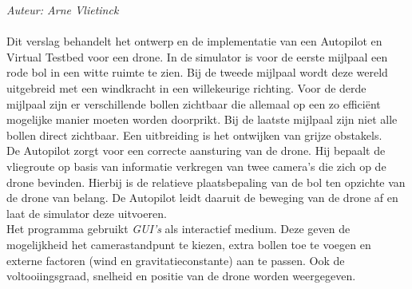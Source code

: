 \noindent
{\em Auteur: Arne Vlietinck}\\
\\
Dit verslag behandelt het ontwerp en de implementatie van een Autopilot en Virtual Testbed voor een drone. In de simulator is voor de eerste mijlpaal een rode bol in een witte ruimte te zien. Bij de tweede mijlpaal wordt deze wereld uitgebreid met een windkracht in een willekeurige richting. Voor de derde mijlpaal zijn er verschillende bollen zichtbaar die allemaal op een zo efficiënt mogelijke manier moeten worden doorprikt. Bij de laatste mijlpaal zijn niet alle bollen direct zichtbaar. Een uitbreiding is het ontwijken van grijze obstakels.
\\
De Autopilot zorgt voor een correcte aansturing van de drone. Hij bepaalt de vliegroute op basis van informatie verkregen van twee camera's die zich op de drone bevinden. Hierbij is de relatieve plaatsbepaling van de bol ten opzichte van de drone van belang. De Autopilot leidt daaruit de beweging van de drone af en laat de simulator deze uitvoeren.
\\
Het programma gebruikt \textit{GUI's} als interactief medium. Deze geven de mogelijkheid het camerastandpunt te kiezen, extra bollen toe te voegen en externe factoren (wind en gravitatieconstante) aan te passen. Ook de voltooiingsgraad, snelheid en positie van de drone worden weergegeven.
